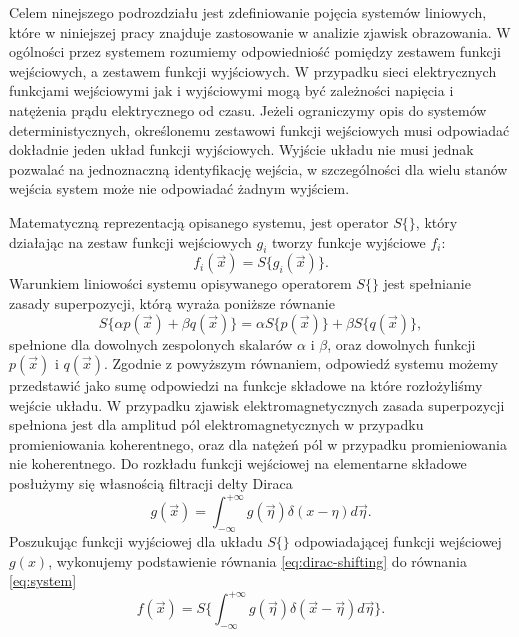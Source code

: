 Celem ninejszego podrozdziału jest zdefiniowanie pojęcia systemów liniowych, które w niniejszej pracy znajduje zastosowanie w analizie zjawisk obrazowania. W ogólności przez systemem rozumiemy odpowiedniość pomiędzy zestawem funkcji wejściowych, a zestawem funkcji wyjściowych. W przypadku sieci elektrycznych funkcjami wejściowymi jak i wyjściowymi mogą być zależności napięcia i natężenia prądu elektrycznego od czasu. Jeżeli ograniczymy opis do systemów deterministycznych, określonemu zestawowi funkcji wejściowych musi odpowiadać dokładnie jeden układ funkcji wyjściowych. Wyjście układu nie musi jednak pozwalać na jednoznaczną identyfikację wejścia, w szczególności dla wielu stanów wejścia system może nie odpowiadać żadnym wyjściem.

\label{art:lsi}

Matematyczną reprezentacją opisanego systemu, jest operator $S\{\}$, który działając na zestaw funkcji wejściowych $g_i$ tworzy funkcje wyjściowe $f_i$:
\begin{equation}
f_i(\vec{x})=S\{g_i(\vec{x})\}.
\label{eq:system}
\end{equation} 
Warunkiem liniowości systemu opisywanego operatorem $S\{\}$ jest spełnianie zasady superpozycji, którą wyraża poniższe równanie
\begin{equation}
S\{\alpha p(\vec{x}) + \beta q(\vec{x})\} = \alpha S\{p(\vec{x})\} + \beta S\{q(\vec{x})\},
\label{eq:lin-system}
\end{equation}
spełnione dla dowolnych zespolonych skalarów $\alpha$ i $\beta$, oraz dowolnych funkcji $p(\vec{x})$ i $q(\vec{x})$. Zgodnie z powyższym równaniem, odpowiedź systemu możemy przedstawić jako sumę odpowiedzi na funkcje składowe na które rozłożyliśmy wejście układu. W przypadku zjawisk elektromagnetycznych zasada superpozycji spełniona jest dla amplitud pól elektromagnetycznych w przypadku promieniowania koherentnego, oraz dla natężeń pól w przypadku promieniowania nie koherentnego. Do rozkładu funkcji wejściowej na elementarne składowe posłużymy się własnością filtracji delty Diraca
\begin{equation}
g(\vec{x})=\int_{-\infty}^{+\infty} g(\vec{\eta}) \delta(x-\eta) d \vec{\eta}.
\label{eq:dirac-shifting}
\end{equation}
Poszukując funkcji wyjściowej dla układu $S\{\}$ odpowiadającej funkcji wejściowej $g(x)$, wykonujemy podstawienie równania \ref{eq:dirac-shifting} do równania \ref{eq:system} 
\begin{equation}
f(\vec{x})=S \{\int_{-\infty}^{+\infty} g(\vec{\eta}) \delta(\vec{x}-\vec{\eta}) d \vec{\eta} \}.
\label{eq:dirac-shift2}
\end{equation}
